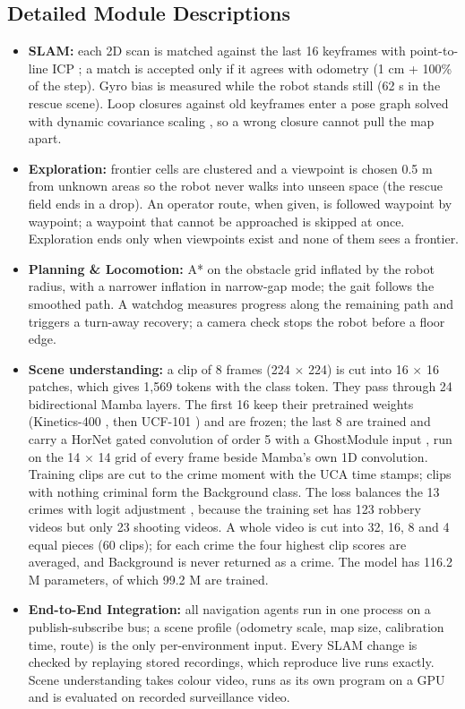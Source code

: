 \documentclass[11pt, a4paper]{article}
\begin{document}
\subsection{Detailed Module Descriptions}
\begin{itemize}[noitemsep, topsep=2pt]
    \item \textbf{SLAM:} each 2D scan is matched against the last 16 keyframes with point-to-line ICP \cite{censi2008}; a match is accepted only if it agrees with odometry (1 cm + 100\% of the step). Gyro bias is measured while the robot stands still (62 s in the rescue scene). Loop closures against old keyframes enter a pose graph solved with dynamic covariance scaling \cite{agarwal2013}, so a wrong closure cannot pull the map apart.
    \item \textbf{Exploration:} frontier cells are clustered and a viewpoint is chosen 0.5 m from unknown areas so the robot never walks into unseen space (the rescue field ends in a drop). An operator route, when given, is followed waypoint by waypoint; a waypoint that cannot be approached is skipped at once. Exploration ends only when viewpoints exist and none of them sees a frontier.
    \item \textbf{Planning \& Locomotion:} A* on the obstacle grid inflated by the robot radius, with a narrower inflation in narrow-gap mode; the gait follows the smoothed path. A watchdog measures progress along the remaining path and triggers a turn-away recovery; a camera check stops the robot before a floor edge.
    \item \textbf{Scene understanding:} a clip of 8 frames (224 $\times$ 224) is cut into 16 $\times$ 16 patches, which gives 1,569 tokens with the class token. They pass through 24 bidirectional Mamba layers. The first 16 keep their pretrained weights (Kinetics-400 \cite{kay2017}, then UCF-101 \cite{soomro2012}) and are frozen; the last 8 are trained and carry a HorNet gated convolution of order 5 with a GhostModule input \cite{han2020}, run on the 14 $\times$ 14 grid of every frame beside Mamba's own 1D convolution. Training clips are cut to the crime moment with the UCA time stamps; clips with nothing criminal form the Background class. The loss balances the 13 crimes with logit adjustment \cite{menon2021}, because the training set has 123 robbery videos but only 23 shooting videos. A whole video is cut into 32, 16, 8 and 4 equal pieces (60 clips); for each crime the four highest clip scores are averaged, and Background is never returned as a crime. The model has 116.2 M parameters, of which 99.2 M are trained.
    \item \textbf{End-to-End Integration:} all navigation agents run in one process on a publish-subscribe bus; a scene profile (odometry scale, map size, calibration time, route) is the only per-environment input. Every SLAM change is checked by replaying stored recordings, which reproduce live runs exactly. Scene understanding takes colour video, runs as its own program on a GPU and is evaluated on recorded surveillance video.
\end{itemize}
\end{document}
